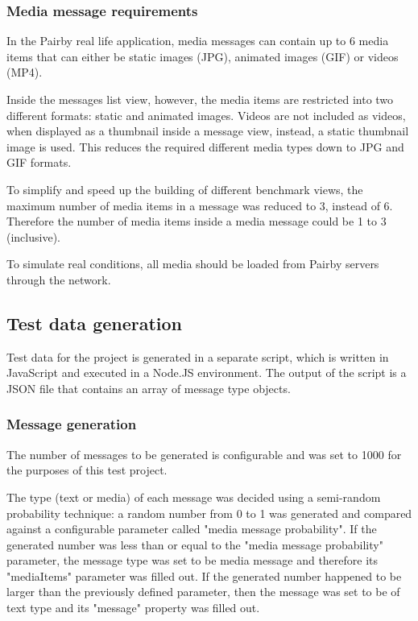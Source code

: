 \documentclass[a4paper,12pt]{article}
\begin{document}
\subsubsection*{Media message requirements}
In the Pairby real life application, media messages can contain up to 6 media items that can either be static images (JPG), animated images (GIF) or videos (MP4).

Inside the messages list view, however, the media items are restricted into two different formats: static and animated images. Videos are not included as videos, when displayed as a thumbnail inside a message view, instead, a static thumbnail image is used. This reduces the required different media types down to JPG and GIF formats.

To simplify and speed up the building of different benchmark views, the maximum number of media items in a message was reduced to 3, instead of 6. Therefore the number of media items inside a media message could be 1 to 3 (inclusive).

To simulate real conditions, all media should be loaded from Pairby servers through the network.

\subsection{Test data generation}
Test data for the project is generated in a separate script, which is written in JavaScript and executed in a Node.JS environment. The output of the script is a JSON file that contains an array of message type objects.

\subsubsection*{Message generation}
The number of messages to be generated is configurable and was set to 1000 for the purposes of this test project.

The type (text or media) of each message was decided using a semi-random probability technique: a random number from 0 to 1 was generated and compared against a configurable parameter called "media message probability". If the generated number was less than or equal to the "media message probability" parameter, the message type was set to be media message and therefore its "mediaItems" parameter was filled out. If the generated number happened to be larger than the previously defined parameter, then the message was set to be of text type and its "message" property was filled out.
\end{document}
